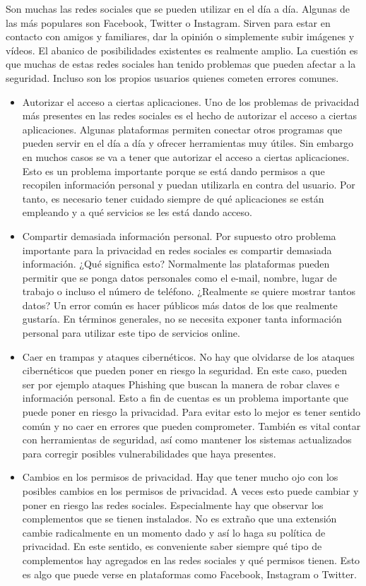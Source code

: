 Son muchas las redes sociales que se pueden utilizar en el día a día. Algunas de las más populares son Facebook, Twitter o Instagram. Sirven para estar en contacto con amigos y familiares, dar la opinión o simplemente subir imágenes y vídeos. El abanico de posibilidades existentes es realmente amplio. La cuestión es que muchas de estas redes sociales han tenido problemas que pueden afectar a la seguridad. Incluso son los propios usuarios quienes cometen errores comunes.
\begin{itemize}
    \item Autorizar el acceso a ciertas aplicaciones. Uno de los problemas de privacidad más presentes en las redes sociales es el hecho de autorizar el acceso a ciertas aplicaciones. Algunas plataformas permiten conectar otros programas que pueden servir en el día a día y ofrecer herramientas muy útiles. Sin embargo en muchos casos se va a tener que autorizar el acceso a ciertas aplicaciones. Esto es un problema importante porque se está dando permisos a que recopilen información personal y puedan utilizarla en contra del usuario. Por tanto, es necesario tener cuidado siempre de qué aplicaciones se están empleando y a qué servicios se les está dando acceso.
    \item Compartir demasiada información personal. Por supuesto otro problema importante para la privacidad en redes sociales es compartir demasiada información. ¿Qué significa esto? Normalmente las plataformas pueden permitir que se ponga datos personales como el e-mail, nombre, lugar de trabajo o incluso el número de teléfono. ¿Realmente se quiere mostrar tantos datos? Un error común es hacer públicos más datos de los que realmente gustaría. En términos generales, no se necesita exponer tanta información personal para utilizar este tipo de servicios online.
    \item Caer en trampas y ataques cibernéticos. No hay que olvidarse de los ataques cibernéticos que pueden poner en riesgo la seguridad. En este caso, pueden ser por ejemplo ataques Phishing que buscan la manera de robar claves e información personal. Esto a fin de cuentas es un problema importante que puede poner en riesgo la privacidad. Para evitar esto lo mejor es tener sentido común y no caer en errores que pueden comprometer. También es vital contar con herramientas de seguridad, así como mantener los sistemas actualizados para corregir posibles vulnerabilidades que haya presentes.
    \item Cambios en los permisos de privacidad. Hay que tener mucho ojo con los posibles cambios en los permisos de privacidad. A veces esto puede cambiar y poner en riesgo las redes sociales. Especialmente hay que observar los complementos que se tienen instalados. No es extraño que una extensión cambie radicalmente en un momento dado y así lo haga su política de privacidad. En este sentido, es conveniente saber siempre qué tipo de complementos hay agregados en las redes sociales y qué permisos tienen. Esto es algo que puede verse en plataformas como Facebook, Instagram o Twitter.
\end{itemize}    

